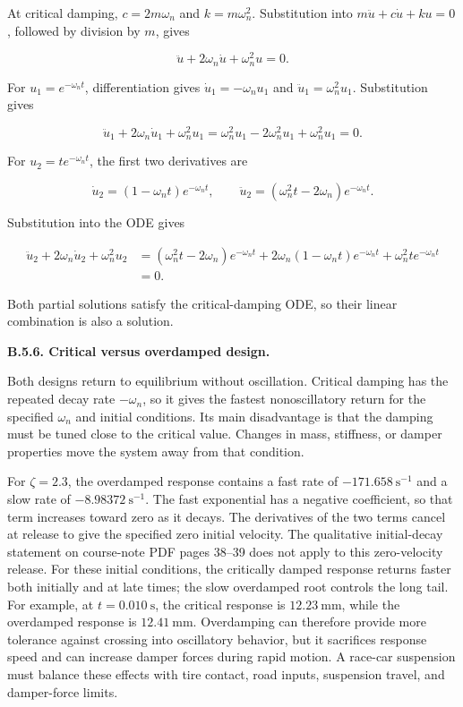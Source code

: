 At critical damping, $c=2m\omega_n$ and $k=m\omega_n^2$. Substitution into $m\ddot{u}+c\dot{u}+ku=0$, followed by division by $m$, gives

\[
\ddot{u}+2\omega_n\dot{u}+\omega_n^2u=0.
\]

For $u_1=e^{-\omega_nt}$, differentiation gives $\dot{u}_1=-\omega_nu_1$ and $\ddot{u}_1=\omega_n^2u_1$. Substitution gives

\[
\ddot{u}_1+2\omega_n\dot{u}_1+\omega_n^2u_1
=\omega_n^2u_1-2\omega_n^2u_1+\omega_n^2u_1=0.
\]

For $u_2=te^{-\omega_nt}$, the first two derivatives are

\[
\dot{u}_2=(1-\omega_nt)e^{-\omega_nt},
\qquad
\ddot{u}_2=(\omega_n^2t-2\omega_n)e^{-\omega_nt}.
\]

Substitution into the ODE gives

\[
\begin{aligned}
\ddot{u}_2+2\omega_n\dot{u}_2+\omega_n^2u_2
&=(\omega_n^2t-2\omega_n)e^{-\omega_nt}
 +2\omega_n(1-\omega_nt)e^{-\omega_nt}
 +\omega_n^2te^{-\omega_nt}\\
&=0.
\end{aligned}
\]

Both partial solutions satisfy the critical-damping ODE, so their linear combination is also a solution.

\textbf{B.5.6. Critical versus overdamped design.}

Both designs return to equilibrium without oscillation. Critical damping has the repeated decay rate $-\omega_n$, so it gives the fastest nonoscillatory return for the specified $\omega_n$ and initial conditions. Its main disadvantage is that the damping must be tuned close to the critical value. Changes in mass, stiffness, or damper properties move the system away from that condition.

For $\zeta=2.3$, the overdamped response contains a fast rate of $-171.658\ \mathrm{s^{-1}}$ and a slow rate of $-8.98372\ \mathrm{s^{-1}}$. The fast exponential has a negative coefficient, so that term increases toward zero as it decays. The derivatives of the two terms cancel at release to give the specified zero initial velocity. The qualitative initial-decay statement on course-note PDF pages 38--39 does not apply to this zero-velocity release. For these initial conditions, the critically damped response returns faster both initially and at late times; the slow overdamped root controls the long tail. For example, at \(t=0.010\ \mathrm{s}\), the critical response is \(12.23\ \mathrm{mm}\), while the overdamped response is \(12.41\ \mathrm{mm}\). Overdamping can therefore provide more tolerance against crossing into oscillatory behavior, but it sacrifices response speed and can increase damper forces during rapid motion. A race-car suspension must balance these effects with tire contact, road inputs, suspension travel, and damper-force limits.

\clearpage
{}



\endgroup
